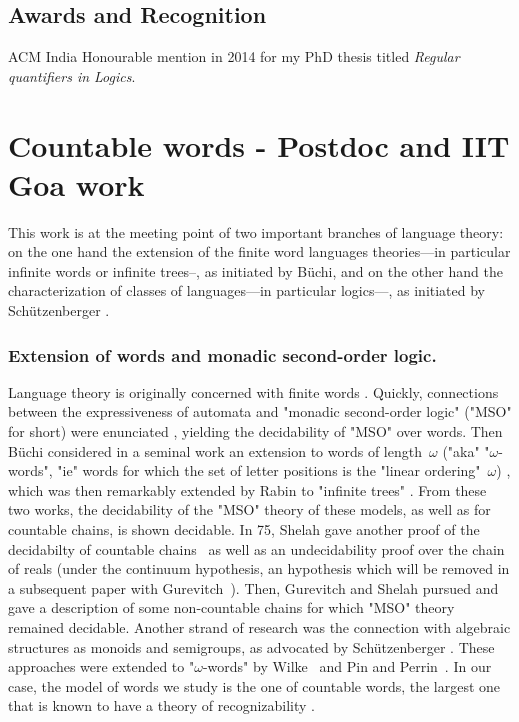 \documentclass[a4paper,10pt]{article}
\theoremstyle{open}
\begin{document}
\subsection{Awards and Recognition}
ACM India Honourable mention in 2014 for my PhD thesis titled \emph{Regular quantifiers in Logics}.

\section{Countable words - Postdoc and IIT Goa work}
This work is at the meeting point of two important branches of language theory: on the one hand the extension of the finite word languages theories---in particular infinite words or infinite trees--, as initiated by Büchi, and on the other hand the characterization of classes of languages---in particular logics---, as initiated by Schützenberger \cite{Schutzenberger65}.

\subsubsection{Extension of words and monadic second-order logic.}
Language theory is originally concerned with finite words \cite{Kleene56,RabinScott59}. Quickly, connections between the expressiveness of automata and "monadic second-order logic" ("MSO" for short) were enunciated \cite{Trakhtenbrot62,Elgott,Buchi60}, yielding the decidability of "MSO" over words.
Then Büchi considered in a seminal work an extension to words of length~$\omega$ ("aka" "$\omega$-words", "ie" words for which the set of letter positions is the "linear ordering"~$\omega$) \cite{Buchi62}, which was then remarkably extended by Rabin to "infinite trees" \cite{Rabin69}. From these two works, the decidability of the "MSO" theory of these models, as well as for countable chains, is shown decidable. In 75, Shelah gave another proof of the decidabilty of countable chains~\cite{Shelah75} as well as an undecidability proof over the chain of reals (under the continuum hypothesis, an hypothesis which will be removed in a subsequent paper with Gurevitch~\cite{GurevichShelah79I,GurevichShelah79II}).
Then, Gurevitch and Shelah pursued and gave a description of some non-countable chains for which "MSO" theory remained decidable.
Another strand of research was the connection with algebraic structures as monoids and semigroups, as advocated by Schützenberger \cite{Schutzenberger56semi}. These approaches were extended to "$\omega$-words" by Wilke~\cite{Wilke93a} and
Pin and Perrin~\cite{PerrinPin04}.
In our case, the model of words we study is the one of countable words, the largest one that is known to have a theory of recognizability \cite{CartonColcombetPuppis}.
\end{document}
